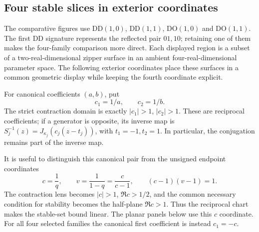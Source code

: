 \subsection{Four stable slices in exterior coordinates}
\label{sec:exterior-zipper-atlas}

The comparative figures use DD$(1,0)$, DD$(1,1)$, DO$(1,0)$ and
DO$(1,1)$. The first DD signature represents the reflected pair
$01,10$; retaining one of them makes the four-family comparison more
direct. Each displayed region is a subset of a two-real-dimensional
zipper surface in an ambient four-real-dimensional parameter space.
The following exterior coordinates place these surfaces in a common
geometric display while keeping the fourth coordinate explicit.

For canonical coefficients $(a,b)$, put
\begin{equation}\label{eq:exterior-canonical-coefficients}
 c_1=1/a,\qquad c_2=1/b.
\end{equation}
The strict contraction domain is exactly $|c_1|>1$, $|c_2|>1$.
These are reciprocal coefficients; if a generator is opposite, its
inverse map is $S_j^{-1}(z)=J_{\kappa_j}(c_j(z-t_j))$, with
$t_1=-1,t_2=1$. In particular, the conjugation remains part of the
inverse map.

It is useful to distinguish this canonical pair from the unsigned
endpoint coordinates
\begin{equation}\label{eq:exterior-endpoint-coordinates}
 c=\frac1q,\qquad v=\frac1{1-q}=\frac{c}{c-1},\qquad
 (c-1)(v-1)=1.
\end{equation}
The contraction lens becomes $|c|>1$, $\Re c>1/2$, and the common
necessary condition for stability becomes the half-plane $\Re c>1$.
Thus the reciprocal chart makes the stable-set bound linear. The
planar panels below use this $c$ coordinate. For all four selected
families the canonical first coefficient is instead $c_1=-c$.

